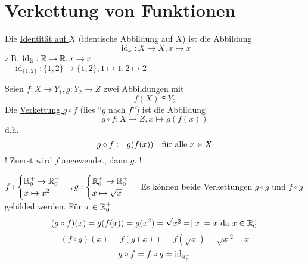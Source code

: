 \documentclass{myclass}
\begin{document}
\section{Verkettung von Funktionen}
\begin{definition}
	Die \underline{Identität auf $ X $} (identische Abbildung auf $ X $) ist die Abbildung
	\[ \operatorname{id}_x : X \to X, x \mapsto x \]
	z.B. $ \operatorname{id}_{\mathbb{R}} : \mathbb{R} \to \mathbb{R}, x \mapsto x $\\
	$ \quad \operatorname{id}_{\{1, 2\}} : \{ 1, 2 \} \to \{ 1, 2 \}, 1 \mapsto 1, 2 \mapsto 2 $
\end{definition}

\begin{definition}
	Seien $ f : X \to Y_1, g : Y_2 \to Z $ zwei Abbildungen mit 
	\[ f(X) \subseteqq Y_2 \]
	Die \underline{Verkettung $ g \circ f $} (lies ``$ g $ nach $ f $'') ist die Abbildung
	\[ g \circ f : X \to Z, x \mapsto g(f(x)) \]
	d.h.
	\[ g \circ f \coloneqq g(f(x)) \quad \text{für alle $ x \in X $} \]
	! Zuerst wird $ f $ angewendet, dann $ g $. !
\end{definition}

\begin{example}
	$ f :
	\begin{cases}
		\mathbb{R}_{0}^{+} \to \mathbb{R}_{0}^{+}\\
		x \mapsto x^2
	\end{cases},
	g :
	\begin{cases}
		\mathbb{R}_{0}^{+} \to \mathbb{R}_{0}^{+}\\
		x \mapsto \sqrt{x}
	\end{cases} $
	Es können beide Verkettungen $ g \circ g $ und $ f \circ g $ gebilded werden. Für $ x \in \mathbb{R}_{0}^{+} $:
	\[ ( g \circ f )(x) = g(f(x)) = g(x^2) = \sqrt{x^2} = \mid x \mid = x \text{ da $ x \in \mathbb{R}_{0}^{+} $} \]
	\[ ( f \circ g )(x) = f(g(x)) = f(\sqrt{x}) = \sqrt{x}^2 = x \]
	\[ g \circ f = f \circ g = \operatorname{id}_{\mathbb{R}_0^+} \]
\end{example}
\end{document}
